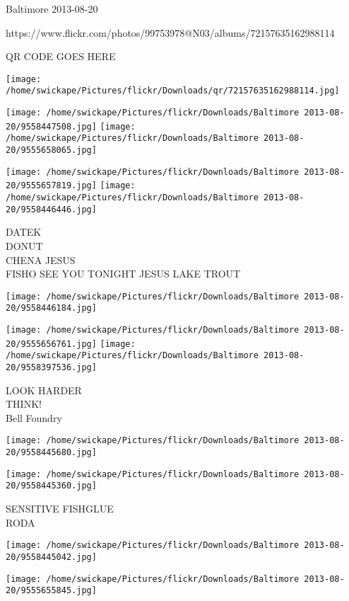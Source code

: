 \documentclass[10pt,letterpaper]{article}
\begin{document}
Baltimore 2013-08-20

https://www.flickr.com/photos/99753978@N03/albums/72157635162988114

QR CODE GOES HERE

\texttt{[image: /home/swickape/Pictures/flickr/Downloads/qr/72157635162988114.jpg]}
\pagebreak

\texttt{[image: /home/swickape/Pictures/flickr/Downloads/Baltimore 2013-08-20/9558447508.jpg]}
\texttt{[image: /home/swickape/Pictures/flickr/Downloads/Baltimore 2013-08-20/9555658065.jpg]}

\texttt{[image: /home/swickape/Pictures/flickr/Downloads/Baltimore 2013-08-20/9555657819.jpg]}
\texttt{[image: /home/swickape/Pictures/flickr/Downloads/Baltimore 2013-08-20/9558446446.jpg]}

DATEK\\
DONUT\\
CHENA JESUS\\
FISHO SEE YOU TONIGHT JESUS LAKE TROUT\\
\pagebreak

\texttt{[image: /home/swickape/Pictures/flickr/Downloads/Baltimore 2013-08-20/9558446184.jpg]}

\vspace{0.25in}
\texttt{[image: /home/swickape/Pictures/flickr/Downloads/Baltimore 2013-08-20/9555656761.jpg]}
\texttt{[image: /home/swickape/Pictures/flickr/Downloads/Baltimore 2013-08-20/9558397536.jpg]}

LOOK HARDER\\
THINK!\\
Bell Foundry\\
\pagebreak

\texttt{[image: /home/swickape/Pictures/flickr/Downloads/Baltimore 2013-08-20/9558445680.jpg]}

\vspace{0.25in}
\texttt{[image: /home/swickape/Pictures/flickr/Downloads/Baltimore 2013-08-20/9558445360.jpg]}

SENSITIVE FISHGLUE\\
RODA\\
\pagebreak

\texttt{[image: /home/swickape/Pictures/flickr/Downloads/Baltimore 2013-08-20/9558445042.jpg]}

\vspace{0.25in}
\texttt{[image: /home/swickape/Pictures/flickr/Downloads/Baltimore 2013-08-20/9555655845.jpg]}
\end{document}
